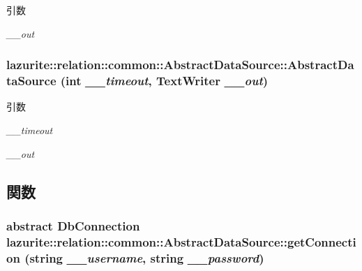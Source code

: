 \begin{DoxyParams}{引数}
\item[{\em \_\-\_\-out}]\end{DoxyParams}
\hypertarget{classlazurite_1_1relation_1_1common_1_1_abstract_data_source_af8a94afbb778766307e208473fe3fa0f}{
\subsubsection[{AbstractDataSource}]{\setlength{\rightskip}{0pt plus 5cm}lazurite::relation::common::AbstractDataSource::AbstractDataSource (int {\em \_\-\_\-timeout}, \/  TextWriter {\em \_\-\_\-out})}}
\label{classlazurite_1_1relation_1_1common_1_1_abstract_data_source_af8a94afbb778766307e208473fe3fa0f}

\begin{DoxyParams}{引数}
\item[{\em \_\-\_\-timeout}]\item[{\em \_\-\_\-out}]\end{DoxyParams}


\subsection{関数}
\hypertarget{classlazurite_1_1relation_1_1common_1_1_abstract_data_source_a1e828b5e7c1e29b21439d910f05005aa}{
\subsubsection[{getConnection}]{\setlength{\rightskip}{0pt plus 5cm}abstract DbConnection lazurite::relation::common::AbstractDataSource::getConnection (string {\em \_\-\_\-username}, \/  string {\em \_\-\_\-password})}}
\label{classlazurite_1_1relation_1_1common_1_1_abstract_data_source_a1e828b5e7c1e29b21439d910f05005aa}


